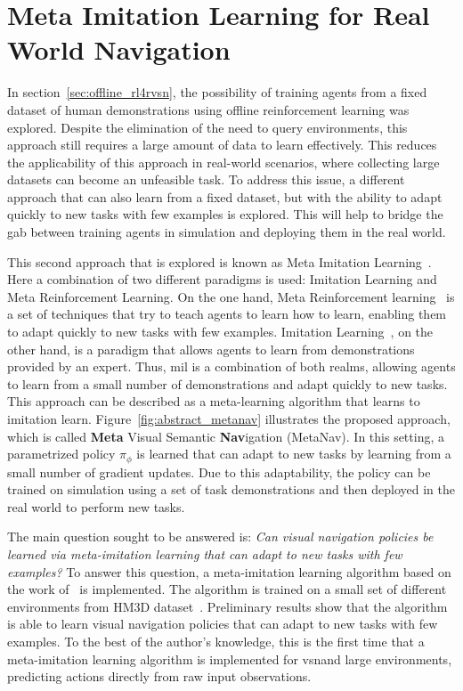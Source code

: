 \section{Meta Imitation Learning for Real World Navigation}\label{sec:mil-for-real-world-navigation}

In section~\ref{sec:offline_rl4rvsn}, the possibility of training agents from a fixed dataset of human demonstrations using offline reinforcement learning was explored.
Despite the elimination of the need to query environments, this approach still requires a large amount of data to learn effectively.
This reduces the applicability of this approach in real-world scenarios, where collecting large datasets can become an unfeasible task.
To address this issue, a different approach that can also learn from a fixed dataset, but with the ability to adapt quickly to new tasks with few examples is explored.
This will help to bridge the gab between training agents in simulation and deploying them in the real world.

This second approach that is explored is known as Meta Imitation Learning~\cite{finnOneShotVisualImitation2017}.
Here a combination of two different paradigms is used: Imitation Learning and Meta Reinforcement Learning.
On the one hand, Meta Reinforcement learning~\cite{Beck_2025} is a set of techniques that try to teach agents to learn how to learn, enabling them to adapt quickly to new tasks with few examples.
Imitation Learning~\cite{10602544}, on the other hand, is a paradigm that allows agents to learn from demonstrations provided by an expert.
Thus, \acrfull{mil} is a combination of both realms, allowing agents to learn from a small number of demonstrations and adapt quickly to new tasks.
This approach can be described as a meta-learning algorithm that learns to imitation learn.
Figure~\ref{fig:abstract_metanav} illustrates the proposed approach, which is called \textbf{Meta} Visual Semantic \textbf{Nav}igation (MetaNav).
In this setting, a parametrized policy $\pi_\phi$ is learned that can adapt to new tasks by learning from a small number of gradient updates.
Due to this adaptability, the policy can be trained on simulation using a set of task demonstrations and then deployed in the real world to perform new tasks.

The main question sought to be answered is: \textit{Can visual navigation policies be learned via meta-imitation learning that can adapt to new tasks with few examples?}
To answer this question, a meta-imitation learning algorithm based on the work of~\cite{finnOneShotVisualImitation2017} is implemented.
The algorithm is trained on a small set of different environments from HM3D dataset~\cite{Ramakrishnan2021HabitatMatterport3D}.
Preliminary results show that the algorithm is able to learn visual navigation policies that can adapt to new tasks with few examples.
To the best of the author's knowledge, this is the first time that a meta-imitation learning algorithm is implemented for \acrshort{vsn}\@ and large environments, predicting actions directly from raw input observations.

